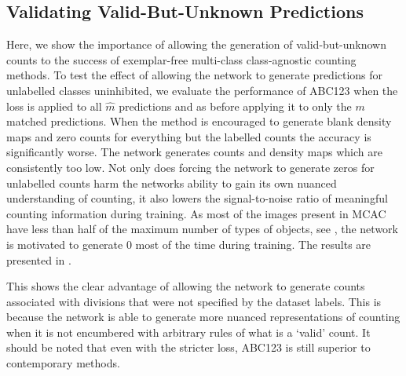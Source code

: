 \documentclass[../thesis.tex]{subfiles}
\begin{document}
\subsection{Validating Valid-But-Unknown Predictions}\label{sec__ABC123__ablation_vbu}
Here, we show the importance of allowing the generation of valid-but-unknown counts to the success of exemplar-free multi-class class-agnostic counting methods.
To test the effect of allowing the network to generate predictions for unlabelled classes uninhibited, we evaluate the performance of ABC123 when the loss is applied to all $\hat{m}$ predictions and as before applying it to only the $m$ matched predictions.
When the method is encouraged to generate blank density maps and zero counts for everything but the labelled counts the accuracy is significantly worse.
The network generates counts and density maps which are consistently too low. 
Not only does forcing the network to generate zeros for unlabelled counts harm the networks ability to gain its own nuanced understanding of counting, it also lowers the signal-to-noise ratio of meaningful counting information during training. 
As most of the images present in MCAC have less than half of the maximum number of types of objects, see , the network is motivated to generate 0 most of the time during training.
The results are presented in .

This shows the clear advantage of allowing the network to generate counts associated with divisions that were not specified by the dataset labels.
This is because the network is able to generate more nuanced representations of counting when it is not encumbered with arbitrary rules of what is a `valid' count.
It should be noted that even with the stricter loss, ABC123 is still superior to contemporary methods. 

\begin{table}
    \centering
    
    \caption{Effect of applying the loss to all regressed counts compared to only the matched counts. When the loss is only applied to the matched $m$ predictions, it is able to generate counts associated with unlabelled divisions. When the loss is applied to all $\hat{m}$ predictions, all of the counts not associated with a count are forced to 0.
    This strict approach damages the training of ABC123 as it reduces the capacity of the network to generate nuanced representations of counting.}
    \label{table__ABC123__ablation_VBU}
\end{table}
\end{document}
